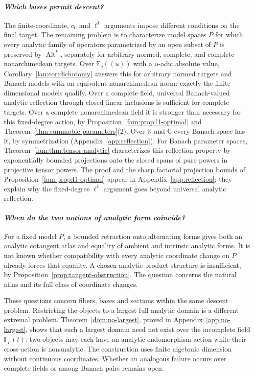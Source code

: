 \documentclass[11pt]{amsart}
\theoremstyle{definition}
\theoremstyle{remark}
\numberwithin{equation}{section}
\newcommand{\F}{\mathbb F}
\newcommand{\Alt}{\operatorname{Alt}}
\begin{document}
\paragraph{\textit{Which bases permit descent?}}
The finite-coordinate, $c_0$ and $\ell^1$ arguments impose different conditions on the final target.
The remaining problem is to characterize model spaces $P$ for which every analytic family of operators
parametrized by an open subset of $P$ is preserved by $\Alt^k$, separately for arbitrary normed,
complete, and complete nonarchimedean targets. Over $\F_q((u))$ with a $u$\nobreakdash-adic absolute
value, Corollary~\ref{lau:cor:dichotomy} answers this for arbitrary normed targets and Banach models
with an equivalent nonarchimedean norm: exactly the finite-dimensional models qualify.
Over a complete field, universal Banach-valued analytic reflection through closed linear inclusions is
sufficient for complete targets. Over a complete nonarchimedean field it is stronger than necessary for
this fixed-degree action, by Proposition~\ref{fam:prop:l1-optimal} and
Theorem~\ref{thm:summable-parameters}(2). Over $\mathbb R$ and $\mathbb C$ every Banach space has it, by symmetrization (Appendix~\ref{app:reflection}). For Banach parameter spaces,
Theorem~\ref{fam:thm:tensor-analytic} characterizes this reflection property by exponentially bounded
projections onto the closed spans of pure powers in projective tensor powers. The proof and the
sharp factorial projection bounds of Proposition~\ref{fam:prop:l1-optimal} appear in
Appendix~\ref{app:reflection}; they explain why the fixed-degree $\ell^1$ argument goes beyond
universal analytic reflection.

\paragraph{\textit{When do the two notions of analytic form coincide?}}
For a fixed model $P$, a bounded retraction onto alternating forms gives both an analytic cotangent
atlas and equality of ambient and intrinsic analytic forms. It is not known whether compatibility with
every analytic coordinate change on $P$ already forces that equality. A chosen analytic product
structure is insufficient, by Proposition~\ref{prop:tangent-obstruction}. The question concerns the
natural atlas and its full class of coordinate changes.

These questions concern fibers, bases and sections within the same descent problem. Restricting the
objects to a largest full analytic domain is a different extremal problem.
Theorem~\ref{dom:no-largest}, proved in Appendix~\ref{app:no-largest}, shows that such a largest domain
need not exist over the incomplete field $\F_p(t)$: two objects may each have an analytic endomorphism
action while their cross-action is nonanalytic. The construction uses finite algebraic dimension
without continuous coordinates. Whether an analogous failure occurs over complete fields or among
Banach pairs remains open.
\end{document}
